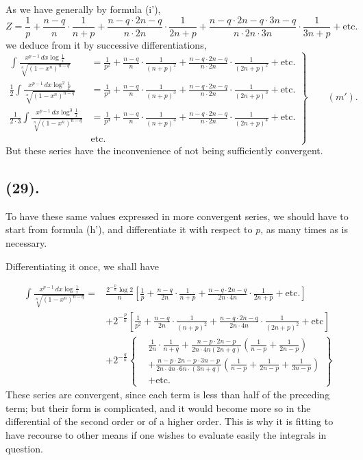 \documentclass{article}
\begin{document}
As we have generally by formula (i'),
\[ Z=\frac{1}{p}+\frac{n-q}{n}\cdot\frac{1}{n+p}+\frac{n-q\cdot 2n-q}{n\cdot 2n}\cdot\frac{1}{2n+p}+\frac{n-q\cdot 2n-q\cdot 3n-q}{n\cdot 2n\cdot 3n}\cdot\frac{1}{3n+p}+\text{etc.} \]
we deduce from it by successive differentiations,
\[ \left.\begin{aligned} \int\frac{x^{p-1}\,dx\log\frac{1}{x}}{\sqrt[n]{(1-x^{n})^{n-q}}}&=\frac{1}{p^{2}}+\frac{n-q}{n}\cdot\frac{1}{(n+p)^{2}}+\frac{n-q\cdot 2n-q}{n\cdot 2n}\cdot\frac{1}{(2n+p)^{2}}+\text{etc.}\\ \frac{1}{2}\int\frac{x^{p-1}\,dx\log^{2}\frac{1}{x}}{\sqrt[n]{(1-x^{n})^{n-q}}}&=\frac{1}{p^{3}}+\frac{n-q}{n}\cdot\frac{1}{(n+p)^{3}}+\frac{n-q\cdot 2n-q}{n\cdot 2n}\cdot\frac{1}{(2n+p)^{3}}+\text{etc.}\\ \frac{1}{2\cdot 3}\int\frac{x^{p-1}\,dx\log^{3}\frac{1}{x}}{\sqrt[n]{(1-x^{n})^{n-q}}}&=\frac{1}{p^{4}}+\frac{n-q}{n}\cdot\frac{1}{(n+p)^{4}}+\frac{n-q\cdot 2n-q}{n\cdot 2n}\cdot\frac{1}{(2n+p)^{4}}+\text{etc.}\\ &\text{etc.} \end{aligned}\right\}\qquad(m'). \]
But these series have the inconvenience of not being sufficiently convergent.

\subsection*{(29).}

To have these same values expressed in more convergent series, we should have to start from formula (h'), and differentiate it with respect to $p$, as many times as is necessary.

Differentiating it once, we shall have

\[ \begin{aligned} \int\frac{x^{p-1}\,dx\log\frac{1}{x}}{\sqrt[n]{(1-x^{n})^{n-q}}}={}&\frac{2^{-\frac{p}{n}}\log 2}{n}\left[\frac{1}{p}+\frac{n-q}{2n}\cdot\frac{1}{n+p}+\frac{n-q\cdot 2n-q}{2n\cdot 4n}\cdot\frac{1}{2n+p}+\text{etc.}\right]\\ &+2^{-\frac{p}{n}}\left[\frac{1}{p^{2}}+\frac{n-q}{2n}\cdot\frac{1}{(n+p)^{2}}+\frac{n-q\cdot 2n-q}{2n\cdot 4n}\cdot\frac{1}{(2n+p)^{2}}+\text{etc}\right]\\ &+2^{-\frac{q}{n}}\left\{\begin{aligned} &\frac{1}{2n}\cdot\frac{1}{n+q}+\frac{n-p\cdot 2n-p}{2n\cdot 4n(2n+q)}\left(\frac{1}{n-p}+\frac{1}{2n-p}\right)\\ &+\frac{n-p\cdot 2n-p\cdot 3n-p}{2n\cdot 4n\cdot 6n\cdot(3n+q)}\left(\frac{1}{n-p}+\frac{1}{2n-p}+\frac{1}{3n-p}\right)\\ &+\text{etc.} \end{aligned}\right\} \end{aligned} \]
These series are convergent, since each term is less than half of the preceding term; but their form is complicated, and it would become more so in the differential of the second order or of a higher order. This is why it is fitting to have recourse to other means if one wishes to evaluate easily the integrals in question.
\end{document}
